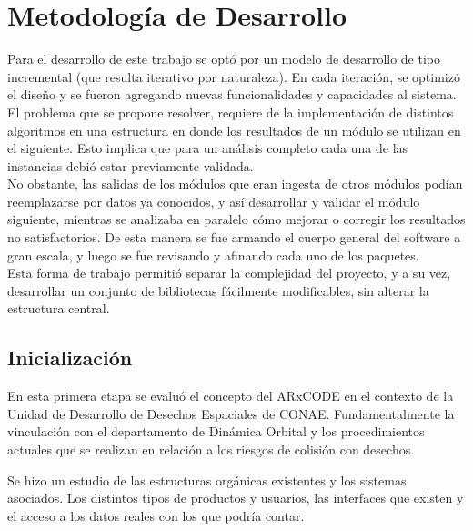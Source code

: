 \chapter{Metodología de Desarrollo}
\label{chap:metodologia}
Para el desarrollo de este trabajo se opt\'o por un modelo de desarrollo de tipo incremental (que resulta iterativo por naturaleza).
En cada iteraci\'on, se optimiz\'o el dise\~no y se fueron agregando nuevas funcionalidades y capacidades al sistema.\\

El problema que se propone resolver, requiere de la implementaci\'on de distintos algoritmos en una estructura en donde los resultados de un m\'odulo se utilizan en el siguiente. Esto implica que para un an\'alisis completo cada una de las instancias debi\'o estar previamente validada.\\
No obstante, las salidas de los m\'odulos que eran ingesta de otros m\'odulos pod\'ian reemplazarse por datos ya conocidos, y as\'i desarrollar y validar el m\'odulo siguiente, mientras se analizaba en paralelo c\'omo mejorar o corregir los resultados no satisfactorios. De esta manera se fue armando el cuerpo general del software a gran escala, y luego se fue revisando y afinando cada uno de los paquetes.\\

Esta forma de trabajo permiti\'o separar la complejidad del proyecto, y a su vez, desarrollar un conjunto de bibliotecas f\'acilmente modificables, sin alterar la estructura central.\\

\section{Inicializaci\'on}
En esta primera etapa se evalu\'o  el concepto del ARxCODE en el contexto de la Unidad de Desarrollo de Desechos Espaciales de CONAE. Fundamentalmente la vinculaci\'on con el departamento de Din\'amica Orbital y los procedimientos actuales que se realizan en relaci\'on a los riesgos de colisi\'on con desechos.

Se hizo un estudio de las estructuras org\'anicas existentes y los sistemas asociados. Los distintos tipos de productos y usuarios, las interfaces que existen y el acceso a los datos reales con los que podr\'ia contar.\\

